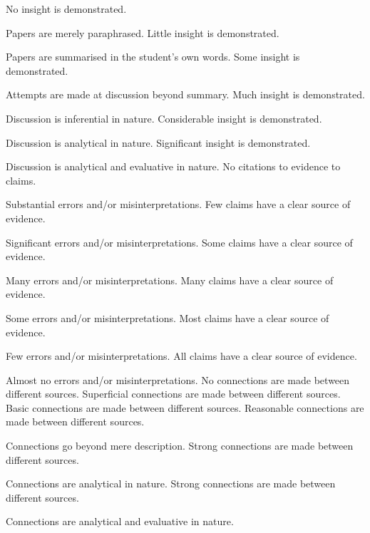 \documentclass{../fal_assignment}
\begin{document}
\begin{markingrubric}
%
        \grade\fail No insight is demonstrated.
        \par		Papers are merely paraphrased.
        \grade		Little insight is demonstrated.
        \par		Papers are summarised in the student's own words.
        \grade		Some insight is demonstrated.
        \par		Attempts are made at discussion beyond summary.
        \grade		Much insight is demonstrated.
        \par		Discussion is inferential in nature.
        \grade		Considerable insight is demonstrated.
        \par		Discussion is analytical in nature.
        \grade		Significant insight is demonstrated.
        \par		Discussion is analytical and evaluative in nature.
%
        \grade\fail 	No citations to evidence to claims.
        \par 		Substantial errors and/or misinterpretations.
        \grade 		Few claims have a clear source of evidence.
        \par 		Significant errors and/or misinterpretations.
        \grade 		Some claims have a clear source of evidence.
        \par 		Many errors and/or misinterpretations.
        \grade 		Many claims have a clear source of evidence.
        \par 		Some errors and/or misinterpretations.
        \grade 		Most claims have a clear source of evidence.
        \par 		Few errors and/or misinterpretations.
        \grade 		All claims have a clear source of evidence.
        \par 		Almost no errors and/or misinterpretations.
%
        \grade\fail No connections are made between different sources.
        \grade		Superficial connections are made between different sources.
        \grade		Basic connections are made between different sources.
        \grade		Reasonable connections are made between different sources.
        \par		Connections go beyond mere description.
        \grade		Strong connections are made between different sources.
        \par		Connections are analytical in nature.
        \grade		Strong connections are made between different sources.
        \par		Connections are analytical and evaluative in nature.

\end{markingrubric}
\end{document}
